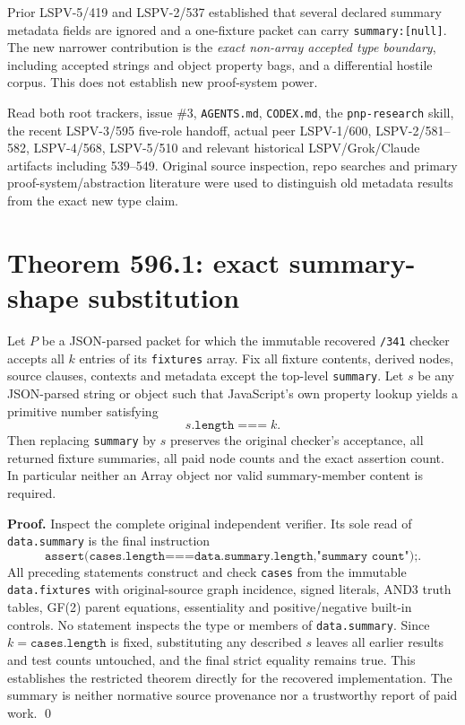 \documentclass[11pt]{article}
\begin{document}
Prior LSPV-5/419 and LSPV-2/537 established that several declared summary metadata fields are ignored and a one-fixture packet can carry \texttt{summary:[null]}. The new narrower contribution is the \emph{exact non-array accepted type boundary}, including accepted strings and object property bags, and a differential hostile corpus. This does not establish new proof-system power.

Read both root trackers, issue \#3, \texttt{AGENTS.md}, \texttt{CODEX.md}, the \texttt{pnp-research} skill, the recent LSPV-3/595 five-role handoff, actual peer LSPV-1/600, LSPV-2/581--582, LSPV-4/568, LSPV-5/510 and relevant historical LSPV/Grok/Claude artifacts including 539--549. Original source inspection, repo searches and primary proof-system/abstraction literature were used to distinguish old metadata results from the exact new type claim.

\section*{Theorem 596.1: exact summary-shape substitution}
Let $P$ be a JSON-parsed packet for which the immutable recovered \texttt{/341} checker accepts all $k$ entries of its \texttt{fixtures} array. Fix all fixture contents, derived nodes, source clauses, contexts and metadata except the top-level \texttt{summary}. Let $s$ be any JSON-parsed string or object such that JavaScript's own property lookup yields a primitive number satisfying
\[
   s.\texttt{length} \; \texttt{===}\; k .
\]
Then replacing \texttt{summary} by $s$ preserves the original checker's acceptance, all returned fixture summaries, all paid node counts and the exact assertion count. In particular neither an Array object nor valid summary-member content is required.

\noindent\textbf{Proof.} Inspect the complete original independent verifier. Its sole read of \texttt{data.summary} is the final instruction
\[
\texttt{assert(cases.length===data.summary.length,"summary count");}.
\]
All preceding statements construct and check \texttt{cases} from the immutable \texttt{data.fixtures} with original-source graph incidence, signed literals, AND3 truth tables, GF(2) parent equations, essentiality and positive/negative built-in controls. No statement inspects the type or members of \texttt{data.summary}. Since $k=\texttt{cases.length}$ is fixed, substituting any described $s$ leaves all earlier results and test counts untouched, and the final strict equality remains true. This establishes the restricted theorem directly for the recovered implementation. The summary is neither normative source provenance nor a trustworthy report of paid work. \qed
\end{document}
